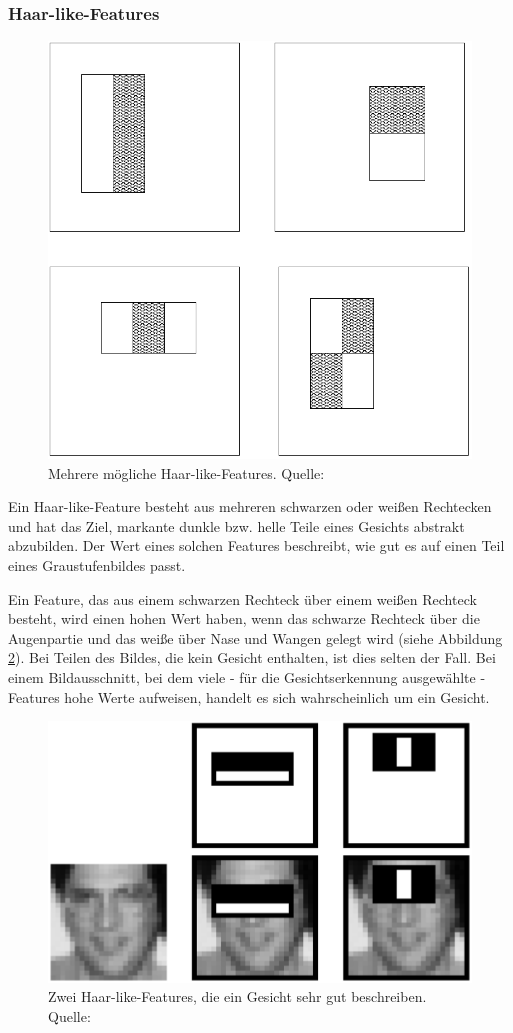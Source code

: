 \documentclass[doktyp=semarbeit, sprache=german]{TUBAFarbeiten}
\begin{document}
\subsubsection{Haar-like-Features}
\begin{figure}
	\centering
	\includegraphics[width=0.4\linewidth]{images/haarfeatures}
	\caption[Haar-like-Features]{Mehrere mögliche Haar-like-Features. Quelle: \cite{Viola01rapidobject}}
	\label{fig:haarfeatures}
\end{figure}


Ein Haar-like-Feature besteht aus mehreren schwarzen oder weißen Rechtecken und hat das Ziel, markante dunkle bzw. helle Teile eines Gesichts abstrakt abzubilden. Der Wert eines solchen Features beschreibt, wie gut es auf einen Teil eines Graustufenbildes passt.

Ein Feature, das aus einem schwarzen Rechteck über einem weißen Rechteck besteht, wird einen hohen Wert haben, wenn das schwarze Rechteck über die Augenpartie und das weiße über Nase und Wangen gelegt wird (siehe Abbildung \ref{fig:haarfeatures2}). Bei Teilen des Bildes, die kein Gesicht enthalten, ist dies selten der Fall. Bei einem Bildausschnitt, bei dem viele - für die Gesichtserkennung ausgewählte - Features hohe Werte aufweisen, handelt es sich wahrscheinlich um ein Gesicht.

\begin{figure}
	\centering
	\includegraphics[width=0.7\linewidth]{images/haarfeatures2}
	\caption[Haar-like-Features - Beispiel]{Zwei Haar-like-Features, die ein Gesicht sehr gut beschreiben. Quelle: \cite{Viola01rapidobject}}
	\label{fig:haarfeatures2}
\end{figure}
\end{document}
